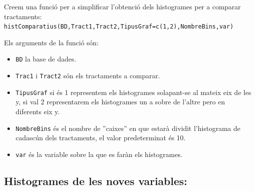 \documentclass[11pt,a4paper]{article}\usepackage[]{graphicx}\usepackage[]{color}
\begin{document}
Creem una funció per a simplificar l'obtenció dels histogrames per a comparar tractaments:\\

\texttt{histComparatius(BD,Tract1,Tract2,TipusGraf=c(1,2),NombreBins,var)}

Els arguments de la funció són:

\begin{itemize}
  \item \texttt{BD} la base de dades.
  
  \item \texttt{Trac1} i \texttt{Tract2} són els tractaments a comparar.
  
  \item \texttt{TipusGraf} si és 1 representem els histogrames solapant-se al mateix eix de les y,
               si val 2 representarem els histogrames un a sobre de l'altre pero en diferents eix y.
               
  \item \texttt{NombreBins} és el nombre de ''caixes'' en que estarà dividit l'histograma de cadascún dels tractaments, el valor predeterminat és 10.
  
  \item \texttt{var} és la variable sobre la que es faràn els histogrames.
\end{itemize}



\subsection{Histogrames de les noves variables:}
\end{document}
